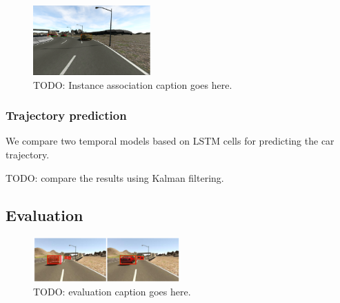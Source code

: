\documentclass[10pt,twocolumn,letterpaper]{article}
\begin{document}
\begin{figure}[t]
        \centering
        \includegraphics[width=0.4\textwidth]{figures/double_detection.png}
        \caption{ {\small TODO: Instance association caption goes here.}}
        \label{fig:Instance_associationn}
\end{figure}

\subsubsection{Trajectory prediction}

We compare two temporal models based on LSTM cells for predicting the car trajectory.

TODO: compare the results using Kalman filtering.



\subsection{Evaluation}
\begin{figure}[t]
        \centering
        \includegraphics[width=0.5\textwidth]{figures/evaluation.pdf}
        \caption{ {\small TODO: evaluation caption goes here.}}
        \label{fig:evaluation}
\end{figure}
\end{document}
